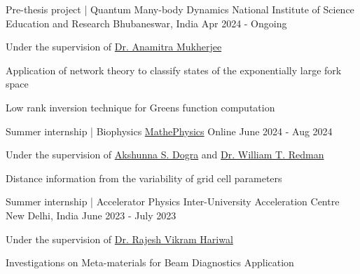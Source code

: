 

\begin{cventries}

\cventry
{Pre-thesis project | Quantum Many-body Dynamics} %
{National Institute of Science Education and Research} %
{Bhubaneswar, India} %
{Apr 2024 - Ongoing} %
{
	\begin{cvitems} %
		\item{Under the supervision of \href{https://sites.google.com/site/workpagetemp}{Dr. Anamitra Mukherjee}}
		\item Application of network theory to classify states of the exponentially large fork space
		\item Low rank inversion technique for Greens function computation\\
	\end{cvitems}
}

\cventry
{Summer internship | Biophysics
} %
{\href{https://github.com/MathePhysics}{MathePhysics}} %
{Online} %
{June 2024 - Aug 2024} %
{
	\begin{cvitems} %
		\item{Under the supervision of \href{https://asdogra.mit.edu/mentorship}{Akshunna S. Dogra}} and \href{https://wredman4.wixsite.com/wtredman}{Dr. William T. Redman}
		\item Distance information from the variability of grid cell parameters\\
	\end{cvitems}
}

\cventry
{Summer internship | Accelerator Physics} %
{Inter-University Acceleration Centre} %
{New Delhi, India} %
{June 2023 - July 2023} %
{
	\begin{cvitems} %
		\item{Under the supervision of \href{https://www.researchgate.net/profile/Dr-Hariwal}{Dr. Rajesh Vikram Hariwal}}
		\item Investigations on Meta-materials for Beam Diagnostics Application \\
	\end{cvitems}
}



\end{cventries}
